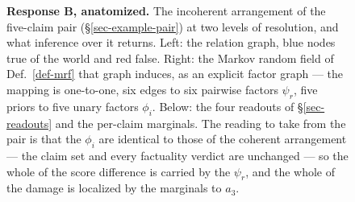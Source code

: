 \begin{figure}[tbp]
\caption{\textbf{Response B, anatomized.} The incoherent arrangement of the
  five-claim pair (\S\ref{sec-example-pair}) at two levels of resolution, and what
  inference over it returns. Left: the relation graph, blue nodes true of the world
  and red false. Right: the Markov random field of Def.~\ref{def-mrf} that graph
  induces, as an explicit factor graph --- the mapping is one-to-one, six edges to
  six pairwise factors $\psi_r$, five priors to five unary factors $\phi_i$. Below:
  the four readouts of \S\ref{sec-readouts} and the per-claim marginals. The reading to
  take from the pair is that the $\phi_i$ are identical to those of the coherent
  arrangement --- the claim set and every factuality verdict are unchanged --- so the
  whole of the score difference is carried by the $\psi_r$, and the whole of the
  damage is localized by the marginals to $a_3$.}
\label{fig:response-b-anatomy}
\fi
\end{figure}
